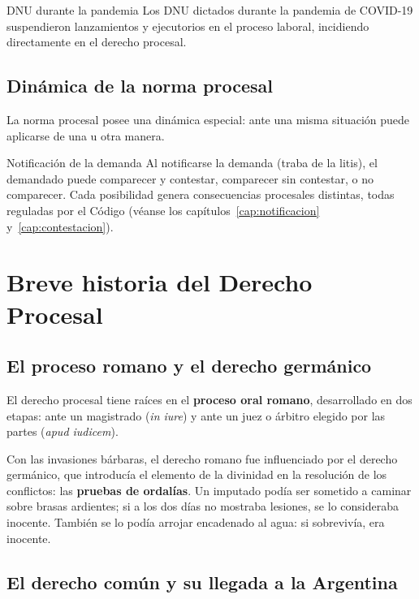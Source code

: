 \documentclass[12pt,oneside]{book}
\begin{document}
\begin{ejemplo}{DNU durante la pandemia}
Los DNU dictados durante la pandemia de COVID-19 suspendieron lanzamientos y ejecutorios en el proceso laboral, incidiendo directamente en el derecho procesal.
\end{ejemplo}

\subsection{Dinámica de la norma procesal}

La norma procesal posee una dinámica especial: ante una misma situación puede aplicarse de una u otra manera.

\begin{ejemplo}{Notificación de la demanda}
Al notificarse la demanda (traba de la litis), el demandado puede comparecer y contestar, comparecer sin contestar, o no comparecer. Cada posibilidad genera consecuencias procesales distintas, todas reguladas por el Código (véanse los capítulos~\ref{cap:notificacion} y~\ref{cap:contestacion}).
\end{ejemplo}

\section{Breve historia del Derecho Procesal}

\subsection{El proceso romano y el derecho germánico}

El derecho procesal tiene raíces en el \textbf{proceso oral romano}, desarrollado en dos etapas: ante un magistrado (\textit{in iure}) y ante un juez o árbitro elegido por las partes (\textit{apud iudicem}).

Con las invasiones bárbaras, el derecho romano fue influenciado por el derecho germánico, que introducía el elemento de la divinidad en la resolución de los conflictos: las \textbf{pruebas de ordalías}. Un imputado podía ser sometido a caminar sobre brasas ardientes; si a los dos días no mostraba lesiones, se lo consideraba inocente. También se lo podía arrojar encadenado al agua: si sobrevivía, era inocente.

\subsection{El derecho común y su llegada a la Argentina}
\end{document}
